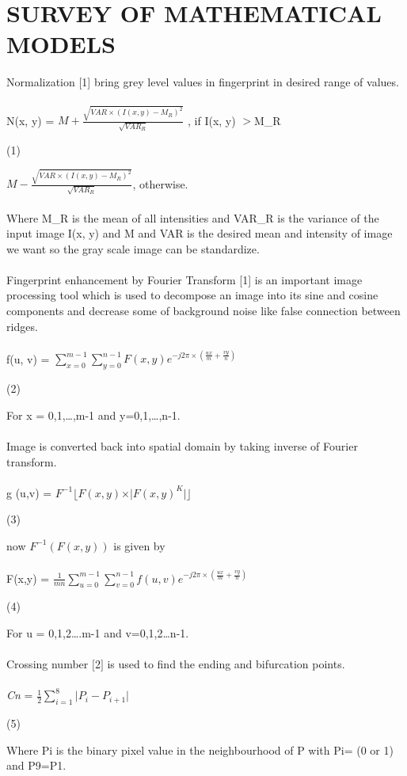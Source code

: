 \documentclass[a4paper, 12pt]{article}
\begin{document}
\section{SURVEY OF MATHEMATICAL MODELS}
Normalization [1] bring grey level values in fingerprint in desired range of values.\\\\
N(x, y) = $M+\frac{\sqrt{VAR\times (I(x,y)-M_R)^{2}} }{\sqrt{VAR_R}}$
, if I(x, y) $>$M\_R \begin{flushright}
(1)
\end{flushright}
\hspace{2cm} $M-\frac{\sqrt{VAR\times (I(x,y)-M_R)^{2}} }{\sqrt{VAR_R}}$, 
otherwise.\\\\
Where M\_R is the mean of all intensities and VAR\_R is the variance of the input image I(x, y) and M and VAR is the desired mean and intensity of image we want so the gray scale image can be standardize.\\\\
Fingerprint enhancement by Fourier Transform [1] is an important image processing tool which is used to decompose an image into its sine and cosine components and decrease some of background noise like false connection between ridges.\\\\
f(u, v) = $\sum_{x=0}^{m-1}{\sum_{y=0}^{n-1}{F(x,y)e^{-j2\pi \times 
(\frac{ux}{m}+\frac{vy}{n})}}}$
\begin{flushright}
(2)
\end{flushright}
For x = 0,1,\ldots ,m-1 and y=0,1,\ldots ,n-1.\\\\
Image is converted back into spatial domain by taking inverse of Fourier transform.\\\\
g (u,v) = $F^{-1}\lfloor F(x,y)\times \vert F(x,y)^{K}\vert \rfloor $ \begin{flushright}
(3)
\end{flushright}
now $F^{-1}(F(x,y))$ is given by\\\\
F(x,y) = $\frac{1}{mn}\sum_{u=0}^{m-1}{\sum_{v=0}^{n-1}{f(u,v)e^{-j2\pi 
\times (\frac{ux}{m}+\frac{vy}{n})}}}$ 
\begin{flushright}
(4)
\end{flushright} 
For u = 0,1,2\ldots .m-1 and v=0,1,2\ldots n-1.\\\\
Crossing number $[$2$]$ is used to find the ending and bifurcation 
points.\\\\
\textit{Cn }= $\frac{1}{2}\sum_{i=1}^{8}{\vert P_{i}-P_{i+1}\vert }$
\begin{flushright}
(5)
\end{flushright}
Where Pi is the binary pixel value in the neighbourhood of P with Pi= (0 
or 1) and P9=P1.
\end{document}
